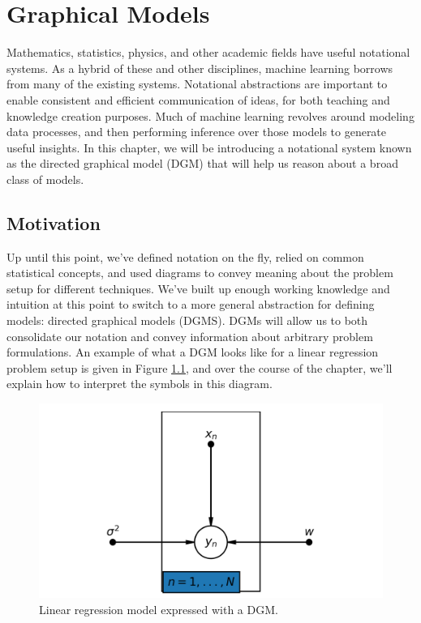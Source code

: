 \chapter{Graphical Models}
Mathematics, statistics, physics, and other academic fields have useful notational systems. As a hybrid of these and other disciplines, machine learning borrows from many of the existing systems. Notational abstractions are important to enable consistent and efficient communication of ideas, for both teaching and knowledge creation purposes. Much of machine learning revolves around modeling data processes, and then performing inference over those models to generate useful insights. In this chapter, we will be introducing a notational system known as the directed graphical model (DGM) that will help us reason about a broad class of models.

\section{Motivation}
Up until this point, we've defined notation on the fly, relied on common statistical concepts, and used diagrams to convey meaning about the problem setup for different techniques. We've built up enough working knowledge and intuition at this point to switch to a more general abstraction for defining models: directed graphical models (DGMS). DGMs will allow us to both consolidate our notation and convey information about arbitrary problem formulations. An example of what a DGM looks like for a linear regression problem setup is given in Figure \ref{fig:lin-reg-dgm}, and over the course of the chapter, we'll explain how to interpret the symbols in this diagram.
\begin{figure}[H]
    \centering
    \includegraphics[width=0.5\paperwidth]{../GraphicalModels/fig/LinearRegressionDGM.png}
    \caption{Linear regression model expressed with a DGM.}
    \label{fig:lin-reg-dgm}
\end{figure}

